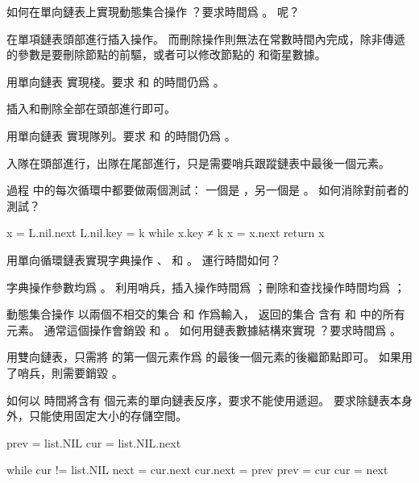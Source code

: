 \startsection[
  title={Linked lists},
]

\startEXERCISE
如何在單向鏈表上實現動態集合操作 ？要求時間爲 。  呢？
\stopEXERCISE

\startANSWER
在單項鏈表頭部進行插入操作。
而刪除操作則無法在常數時間內完成，除非傳遞的參數是要刪除節點的前驅，或者可以修改節點的  和衛星數據。
\stopANSWER

\startEXERCISE
用單向鏈表  實現棧。要求  和  的時間仍爲 。
\stopEXERCISE

\startANSWER
插入和刪除全部在頭部進行即可。
\stopANSWER

\startEXERCISE
用單向鏈表  實現隊列。要求  和  的時間仍爲 。
\stopEXERCISE

\startANSWER
入隊在頭部進行，出隊在尾部進行，只是需要哨兵跟蹤鏈表中最後一個元素。
\stopANSWER

\startEXERCISE
過程  中的每次循環中都要做兩個測試：
一個是 ，另一個是 。
如何消除對前者的測試？
\stopEXERCISE

\startANSWER
{}
\startCLRS
x = L.nil.next
L.nil.key = k
while x.key ≠ k
	x = x.next
return x
\stopCLRS
\stopANSWER

\startEXERCISE
用單向循環鏈表實現字典操作 、  和 。
運行時間如何？
\stopEXERCISE

\startANSWER
字典操作參數均爲 。
利用哨兵，插入操作時間爲 ；刪除和查找操作時間均爲 ；
\stopANSWER

\startEXERCISE
動態集合操作  以兩個不相交的集合  和  作爲輸入，
返回的集合  含有  和  中的所有元素。
通常這個操作會銷毀  和 。
如何用鏈表數據結構來實現 ？要求時間爲 。
\stopEXERCISE

\startANSWER
用雙向鏈表，只需將  的第一個元素作爲  的最後一個元素的後繼節點即可。
如果用了哨兵，則需要銷毀 。
\stopANSWER

\startEXERCISE
如何以  時間將含有  個元素的單向鏈表反序，要求不能使用遞迴。
要求除鏈表本身外，只能使用固定大小的存儲空間。
\stopEXERCISE

\startANSWER
{}
\startCLRS
prev = list.NIL
cur = list.NIL.next

while cur != list.NIL
	next = cur.next
	cur.next = prev
	prev = cur
	cur = next
\stopCLRS
\stopANSWER

